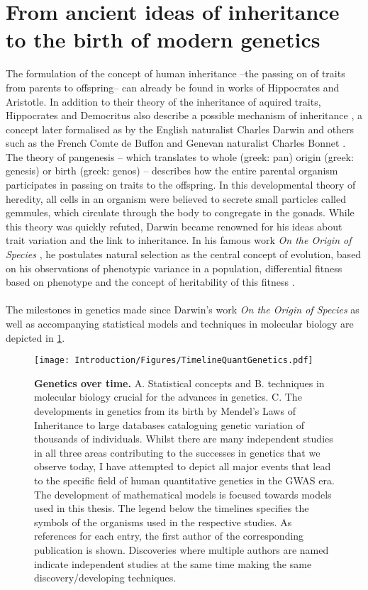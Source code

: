 \section{From ancient ideas of inheritance to the birth of modern genetics}
The formulation of the concept of human inheritance --the passing on of traits from parents to offspring-- can already be found in works of Hippocrates and Aristotle. In addition to their theory of the inheritance of aquired traits, Hippocrates and Democritus also describe a possible mechanism of inheritance \citep{Zirkle1935}, a concept later formalised as  by the English naturalist Charles Darwin \parencite*{Darwin1868} and others such as the French Comte de Buffon \parencite*{Buffon1749} and Genevan naturalist Charles Bonnet \parencite*{Bonnet1779}. The theory of pangenesis -- which translates to whole (greek: pan) origin (greek: genesis) or birth (greek: genos) -- describes how the entire parental organism participates in passing on traits to the offspring. In this developmental theory of heredity, all cells in an organism were believed to secrete small particles called gemmules, which circulate through the body to congregate in the gonads. While this theory was quickly refuted, Darwin became renowned for his ideas about trait variation and the link to inheritance. In his famous work \textit{On the Origin of Species} \parencite*{Darwin1859}, he postulates natural selection as the central concept of evolution, based on his observations of phenotypic variance in a population, differential fitness based on phenotype and the concept of heritability of this fitness \citep{Lewontin1970}. 
\\
\\
The milestones in genetics made since Darwin's work \textit{On the Origin of Species} as well as accompanying statistical models and techniques in molecular biology are depicted in \cref{fig:timeline-genetics}.

\begin{figure}[hbtp]
	\centering
	\texttt{[image: Introduction/Figures/TimelineQuantGenetics.pdf]}
	\caption[\textbf{Genetics over time. }]{\textbf{Genetics over time. } A. Statistical concepts and B. techniques in molecular biology crucial for the advances in genetics. C. The developments in genetics from its birth by Mendel's Laws of Inheritance to large databases cataloguing genetic variation of thousands of individuals. Whilst there are many independent studies in all three areas contributing to the successes in genetics that we observe today, I have attempted to depict all major events that lead to the specific field of human quantitative genetics in the GWAS era. The development of mathematical models is focused towards models used in this thesis. The legend below the timelines specifies the symbols of the organisms used in the respective studies. As references for each entry, the first author of the corresponding publication is shown. Discoveries where multiple authors are named indicate independent studies at the same time making the same discovery/developing techniques. } 
	 	\label{fig:timeline-genetics}
\end{figure}


